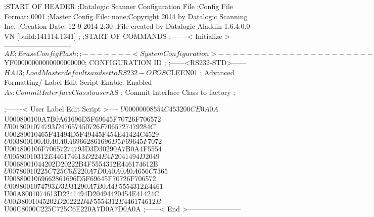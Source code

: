 ;START OF HEADER
;Datalogic Scanner Configuration File
;Config File Format: 0001
;Master Config File: none;Copyright 2014 by Datalogic Scanning Inc.
;Creation Date: 12 9 2014 2:30
;File created by Datalogic Aladdin 1.6.4.0.0 VN [build:141114.1341]
;
;START OF COMMANDS
;-------< Initialize >-----------------------------
$AE                 ; Erase Config Flash
;
;-------< System Configuration >-------------------------------
$YF00000000000000000000; CONFIGURATION ID
;
;------<RS232-STD>------
$HA13               ; Load Master defaults and set to RS232-OPOS
$CLEEN01            ; Advanced Formatting/ Label Edit Script Enable: Enabled
$As                 ; Commit Interface Class to user
$AS                 ; Commit Interface Class to factory
;

;-------< User Label Edit Script >----
$U00000008554C453200CE0A0A
$U000800100A7B0A61696D5F69645F70726F706572
$U0018001074793D47657450726F7065727479284C
$U00280010465F41494D5F49445F454E41424C4529
$U003800100A0A0A0A69662861696D5F69645F7072
$U004800106F70657274793D3D30290A7B0A4F5554
$U00580010312E446174613D224E4F2041494D2049
$U0068001044202D20222B4F5554312E446174612B
$U00780010225C725C6E220A7D0A0A0A0A656C7365
$U0088001069662861696D5F69645F70726F706572
$U0098001074793D3D31290A7B0A4F5554312E4461
$U00A8001074613D2241494D20494420454E41424C
$U00B8001045202D20222B4F5554312E446174612B
$U00C8000C225C725C6E220A7D0A7D0A0A
;------< End >-----------------------
